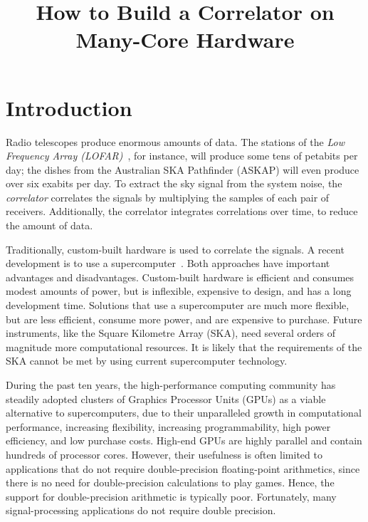 \documentclass{article}
\title{How to Build a Correlator on Many-Core Hardware}
\begin{document}
\maketitle

\begin{abstract}
\end{abstract}

\section{Introduction}


Radio telescopes produce enormous amounts of data.
The stations of the \emph{Low Frequency Array
(LOFAR)\/}~\cite{Butcher:04,deVos:09}, for instance, will produce some tens of
petabits per day; the dishes from the Australian SKA Pathfinder (ASKAP) will
even produce over six exabits per day.
To extract the sky signal from the system noise, the \emph{correlator\/}
correlates the signals by multiplying the samples of each pair of receivers.
Additionally, the correlator integrates correlations over time, to reduce
the amount of data.

Traditionally, custom-built hardware is used to correlate the signals.
A recent development is to use a supercomputer~\cite{Romein:06,Romein:09b}.
Both approaches have important advantages and disadvantages.
Custom-built hardware is efficient and consumes modest amounts of power, but is
inflexible, expensive to design, and has a long development time.
Solutions that use a supercomputer are much more flexible, but are less
efficient, consume more power, and are expensive to purchase.
Future instruments, like the Square Kilometre Array (SKA), need several orders
of magnitude more computational resources.
It is likely that the requirements of the SKA cannot be met by using
current supercomputer technology.

During the past ten years, the high-performance computing community has
steadily adopted clusters of Graphics Processor Units (GPUs) as a viable
alternative to supercomputers, due to their unparalleled growth in
computational performance, increasing flexibility, increasing programmability,
high power efficiency, and low purchase costs.
High-end GPUs are highly parallel and contain hundreds of processor cores.
However, their usefulness is often limited to applications that do not require
double-precision floating-point arithmetics, since there is no need for
double-precision calculations to play games.
Hence, the support for double-precision arithmetic is typically poor.
Fortunately, many signal-processing applications do not require double
precision.
\end{document}
